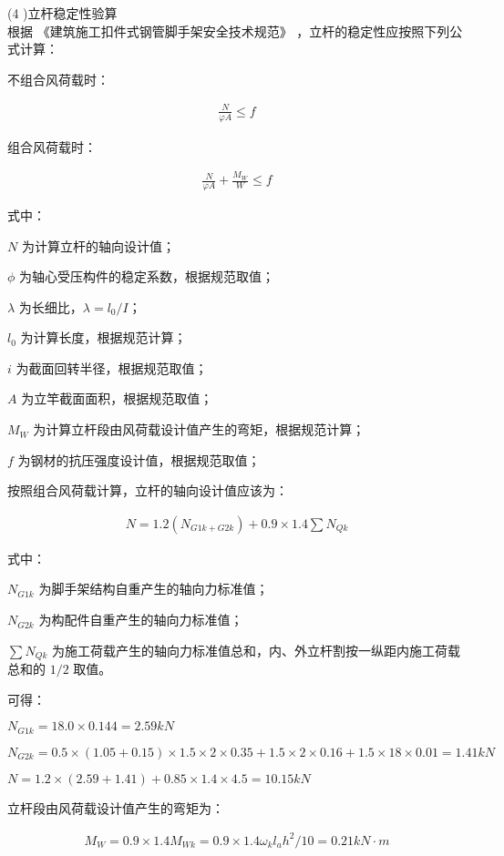 (4 )立杆稳定性验算\\

根据 《建筑施工扣件式钢管脚手架安全技术规范》 ，立杆的稳定性应按照下列公式计算：

不组合风荷载时：

\begin{align}
    \label{fx:nw}
    \frac{N}{\varphi A}\leq f
\end{align}

组合风荷载时：

\begin{align}
    \label{fx:w}
    \frac{N}{\varphi A}+ \frac{M_W}{W}\leq f
\end{align}

式中：

$N$ 为计算立杆的轴向设计值；

$\phi$ 为轴心受压构件的稳定系数，根据规范取值；

$\lambda$ 为长细比，$\lambda =l_0/I$；

$l_0$ 为计算长度，根据规范计算；

$i$ 为截面回转半径，根据规范取值；

$A$ 为立竿截面面积，根据规范取值；

$M_W$ 为计算立杆段由风荷载设计值产生的弯矩，根据规范计算；

$f$ 为钢材的抗压强度设计值，根据规范取值；

按照组合风荷载计算，立杆的轴向设计值应该为：

\begin{align}
    \label{fx:Nzhou}
    N=1.2(N_{G1k+G2k})+0.9\times 1.4\sum N_{Qk}
\end{align}

式中：

$N_{G1k}$ 为脚手架结构自重产生的轴向力标准值； 

$N_{G2k}$ 为构配件自重产生的轴向力标准值；

$\sum N_{Qk}$ 为施工荷载产生的轴向力标准值总和，内、外立杆割按一纵距内施工荷载
总和的 $1/2$ 取值。

可得：

$N_{G1k}=18.0\times 0.144=2.59 kN$

$N_{G2k}=0.5\times (1.05+0.15)\times 1.5\times 2\times 0.35+1.5\times 2\times 0.16+1.5\times 18\times 0.01=1.41 kN$

$N=1.2\times (2.59+1.41)+0.85\times 1.4\times 4.5=10.15 kN$

立杆段由风荷载设计值产生的弯矩为：

\begin{align}
    M_W=0.9\times 1.4M_{Wk}=0.9\times 1.4\omega _kl_ah^2/10=0.21kN\cdot m
\end{align}


